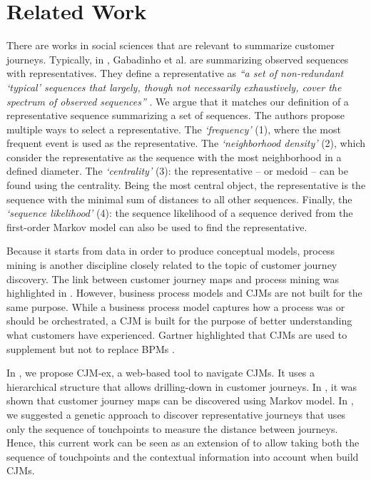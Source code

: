 \documentclass[runningheads]{llncs}
\begin{document}
{\section{Related Work}
There are works in social sciences that are relevant to summarize customer journeys. Typically, in \cite{gabadinho2009summarizing,gabadinho2009extracting}, Gabadinho et al. are summarizing observed sequences with representatives. They define a representative as {\it``a set of non-redundant `typical' sequences that largely, though not necessarily exhaustively, cover the spectrum of observed sequences''} \cite{gabadinho2009summarizing}. We argue that it matches our definition of a representative sequence summarizing a set of sequences. The authors propose multiple ways to select a representative. The {\it `frequency'} (1), where the most frequent event is used as the representative. The {\it `neighborhood density'} (2), which consider the representative as the sequence with the most neighborhood in a defined diameter. The {\it `centrality'} (3): the representative {-- or medoid --} can be found using the centrality. {Being the most central object,} the representative is the sequence with the minimal sum of distances to all other sequences. Finally, the {\it `sequence likelihood'} (4): the sequence likelihood of a sequence derived from the first-order Markov model can also be used to find the representative. 

Because it starts from data in order to produce conceptual models, process mining is another discipline closely related to the topic of customer journey discovery. The link between customer journey maps and process mining was highlighted in \cite{bernard2017cjm}. However, business process models and CJMs are not built for the same purpose. While a business process model captures how a process was or should be orchestrated, a CJM is built for the purpose of better understanding what customers have experienced. Gartner highlighted that CJMs are used to supplement but not to replace BPMs \cite{Gartner2015}.

In \cite{bernard2017cjmEX}, we propose CJM-ex, a web-based tool to navigate CJMs. It uses a hierarchical structure that allows drilling-down in customer journeys. In \cite{bernard2017Markov}, it was shown that customer journey maps can be discovered using Markov model. In \cite{bernard2019genetic}, we suggested a genetic approach to discover representative journeys that uses only the sequence of touchpoints to measure the distance between journeys. Hence, this current work can be seen as an extension of \cite{bernard2019genetic} to allow taking both the sequence of touchpoints and the contextual information into account when build CJMs. 


}
\end{document}
